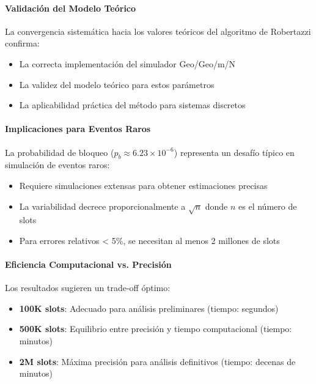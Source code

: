 \documentclass{article}
\begin{document}
\paragraph{Validación del Modelo Teórico}
La convergencia sistemática hacia los valores teóricos del algoritmo de Robertazzi confirma:
\begin{itemize}
    \item La correcta implementación del simulador Geo/Geo/m/N
    \item La validez del modelo teórico para estos parámetros
    \item La aplicabilidad práctica del método para sistemas discretos
\end{itemize}

\paragraph{Implicaciones para Eventos Raros}
La probabilidad de bloqueo ($p_b \approx 6.23 \times 10^{-6}$) representa un desafío típico en simulación de eventos raros:
\begin{itemize}
    \item Requiere simulaciones extensas para obtener estimaciones precisas
    \item La variabilidad decrece proporcionalmente a $\sqrt{n}$ donde $n$ es el número de slots
    \item Para errores relativos < 5\%, se necesitan al menos 2 millones de slots
\end{itemize}

\paragraph{Eficiencia Computacional vs. Precisión}
Los resultados sugieren un trade-off óptimo:
\begin{itemize}
    \item \textbf{100K slots}: Adecuado para análisis preliminares (tiempo: segundos)
    \item \textbf{500K slots}: Equilibrio entre precisión y tiempo computacional (tiempo: minutos)
    \item \textbf{2M slots}: Máxima precisión para análisis definitivos (tiempo: decenas de minutos)
\end{itemize}
\end{document}
